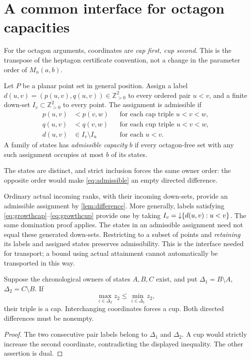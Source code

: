 \section{A common interface for octagon capacities}\label{sec:octagons}
For the octagon arguments, coordinates are \emph{cap first, cup second}.
This is the transpose of the heptagon certificate convention, not a
change in the parameter order of $M_n(a,b)$.

\begin{definition}\label{def:admissible}
Let $P$ be a planar point set in general position. Assign a label
$d(u,v)=(p(u,v),q(u,v))\in\mathbb Z_{>0}^2$ to every ordered pair
$u<v$, and a finite down-set $I_v\subset\mathbb Z_{>0}^2$ to every
point. The assignment is admissible if
\begin{align}
 p(u,v)&<p(v,w)&&\text{for each cap triple }u<v<w,\label{eq:growthcap}\\
 q(u,v)&<q(v,w)&&\text{for each cup triple }u<v<w,\label{eq:growthcup}\\
 d(u,v)&\in I_v\setminus I_u&&\text{for each }u<v.\label{eq:admissible}
\end{align}
A family of states has \emph{admissible capacity} $b$ if every
octagon-free set with any such assignment occupies at most $b$ of
its states.
\end{definition}

The states are distinct, and strict inclusion forces the same owner
order: the opposite order would make \eqref{eq:admissible} an empty
directed difference.

Ordinary actual incoming ranks, with their incoming down-sets, provide
an admissible assignment by \cref{lem:difference}. More generally,
labels satisfying \eqref{eq:growthcap}--\eqref{eq:growthcup} provide one
by taking $I_v=\mathord{\downarrow}\{d(u,v):u<v\}$. The same domination proof applies.
The states in an admissible assignment need not equal these generated
down-sets. Restricting to a subset of points and \emph{retaining} its
labels and assigned states preserves admissibility. This is the
interface needed for transport; a bound using actual attainment cannot
automatically be transported in this way.

\begin{lemma}\label{lem:forced}
Suppose the chronological owners of states $A,B,C$ exist, and put
$\Delta_1=B\setminus A$, $\Delta_2=C\setminus B$. If
\[
 \max_{z\in\Delta_2}z_2\le\min_{z\in\Delta_1}z_2,
\]
their triple is a cap. Interchanging coordinates forces a cup.
Both directed differences must be nonempty.
\end{lemma}
\begin{proof}
The two consecutive pair labels belong to $\Delta_1$ and $\Delta_2$.
A cup would strictly increase the second coordinate, contradicting the
displayed inequality. The other assertion is dual.
\end{proof}

